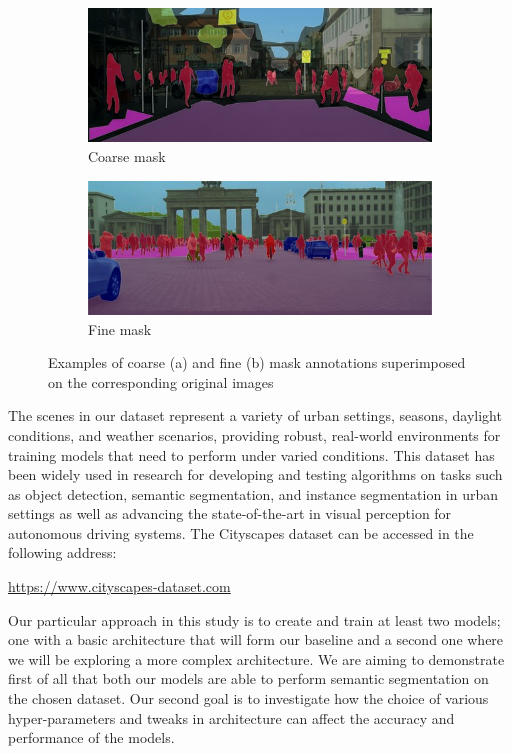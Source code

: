 \begin{figure}[ht]
    \centering
    \begin{subfigure}{0.45\textwidth}
        \centering
        \includegraphics[width=\linewidth]{coarse_example.jpg}
        \caption{Coarse mask}
        \label{fig:sub1}
    \end{subfigure}\hfill
    \begin{subfigure}{0.45\textwidth}
        \centering
        \includegraphics[width=\linewidth]{fine_example.jpg}
        \caption{Fine mask}
        \label{fig:sub2}
    \end{subfigure}
    \caption{Examples of coarse (a) and fine (b) mask annotations superimposed on the corresponding original images}
    \label{fig:cityscapes}
\end{figure}

The scenes in our dataset represent a variety of urban settings, seasons, daylight conditions, and weather scenarios, providing robust, real-world environments for training models that need to perform under varied conditions. This dataset has been widely used in research for developing and testing algorithms on tasks such as object detection, semantic segmentation, and instance segmentation in urban settings as well as advancing the state-of-the-art in visual perception for autonomous driving systems. The Cityscapes dataset can be accessed in the following address:
\begin{center}
\url{https://www.cityscapes-dataset.com}
\end{center}
Our particular approach in this study is to create and train at least two models; one with a basic architecture that will form our baseline and a second one where we will be exploring a more complex architecture. We are aiming to demonstrate first of all that both our models are able to perform semantic segmentation on the chosen dataset. Our second goal is to investigate how the choice of various hyper-parameters and tweaks in architecture can affect the accuracy and performance of the models. 
